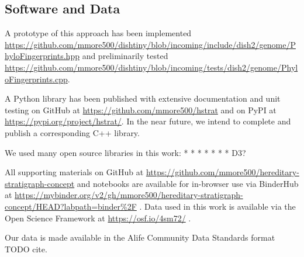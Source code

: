 \subsection{Software and Data}

A prototype of this approach has been implemented \url{https://github.com/mmore500/dishtiny/blob/incoming/include/dish2/genome/PhyloFingerprints.hpp} and preliminarily tested \url{https://github.com/mmore500/dishtiny/blob/incoming/tests/dish2/genome/PhyloFingerprints.cpp}.

A Python library has been published with extensive documentation and unit testing on GitHub at \url{https://github.com/mmore500/hstrat} and on PyPI at \url{https://pypi.org/project/hstrat/}.
In the near future, we intend to complete and publish a corresponding C++ library.

We used many open source libraries in this work:
* \citep{sukumaran2010dendropy}
* \citep{cock2009biopython}
* \citep{virtanen2020scipy}
* \citep{hunter2007matplotlib}
* \citep{virtanen2020scipy}
* \citep{waskom2021seaborn}
* D3?

All supporting materials on GitHub at \url{https://github.com/mmore500/hereditary-stratigraph-concept} and notebooks are available for in-browser use via BinderHub at \url{https://mybinder.org/v2/gh/mmore500/hereditary-stratigraph-concept/HEAD?labpath=binder%2F} \citep{ragan2018binder}.
Data used in this work is available via the Open Science Framework at
\url{https://osf.io/4sm72/} \citep{hstratconceptsupplement} \citep{foster2017open}.

Our data is made available in the Alife Community Data Standards format TODO cite.






